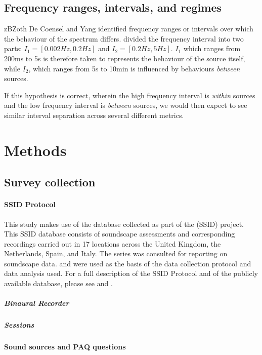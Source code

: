 \subsection{Frequency ranges, intervals, and regimes}

zBZoth De Coensel and Yang identified frequency ranges or intervals over which the behaviour of the spectrum differs. \citet{deCoensel20031f} divided the frequency interval into two parts: $I_1 = [0.002 Hz, 0.2 Hz]$ and $I_2 = [0.2 Hz, 5 Hz]$. $I_1$ which ranges from 200ms to 5s is therefore taken to represents the behaviour of the source itself, while $I_2$, which ranges from 5s to 10min is influenced by behaviours \emph{between} sources.

If this hypothesis is correct, wherein the high frequency interval is \emph{within} sources and the low frequency interval is \emph{between} sources, we would then expect to see similar interval separation across several different metrics.


\section{Methods}
\subsection{Survey collection}

\paragraph{SSID Protocol} This study makes use of the database collected as part of the (SSID) project. This SSID database consists of soundscape assessments and corresponding recordings carried out in 17 locations across the United Kingdom, the Netherlands, Spain, and Italy. The \citet{ISO12913Part1} series was consulted for reporting on soundscape data. \citet{ISO12913Part2} and \citet{ISO12913Part3} were used as the basis of the data collection protocol and data analysis used. For a full description of the SSID Protocol and of the publicly available database, please see \citet{Mitchell2020Soundscape} and \citet{Mitchell2021International}.

\subparagraph{Binaural Recorder}

\subparagraph{Sessions}

\paragraph{Sound sources and PAQ questions}


